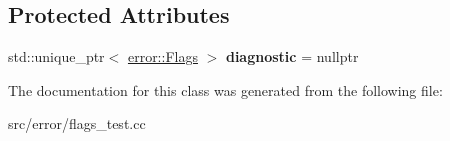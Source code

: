 \subsection*{Protected Attributes}
\begin{DoxyCompactItemize}
\item 
\hypertarget{class_error_flags_test_ad93619dfba84c24ed82eee5724e769ef}{}\label{class_error_flags_test_ad93619dfba84c24ed82eee5724e769ef} 
std\+::unique\+\_\+ptr$<$ \hyperlink{structae_1_1error_1_1_flags}{error\+::\+Flags} $>$ {\bfseries diagnostic} = nullptr
\end{DoxyCompactItemize}


The documentation for this class was generated from the following file\+:\begin{DoxyCompactItemize}
\item 
src/error/flags\+\_\+test.\+cc\end{DoxyCompactItemize}
